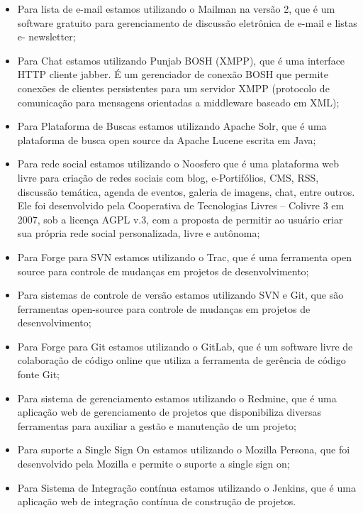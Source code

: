 \begin{itemize}

\item Para lista de e-mail estamos utilizando o Mailman na versão 2, que é um software gratuito para gerenciamento de discussão eletrônica de e-mail e listas e- newsletter;

\item Para Chat estamos utilizando Punjab BOSH (XMPP), que é uma interface HTTP cliente jabber. É um gerenciador de conexão BOSH que permite conexões de clientes persistentes para um servidor XMPP (protocolo de comunicação para mensagens orientadas a middleware baseado em XML);

\item Para Plataforma de Buscas estamos utilizando Apache Solr, que é uma plataforma de busca open source da Apache Lucene escrita em Java;

\item Para rede social estamos utilizando o Noosfero que é uma plataforma web livre para criação de redes sociais com blog, e-Portifólios, CMS, RSS, discussão temática, agenda de eventos, galeria de imagens, chat, entre outros. Ele foi desenvolvido pela Cooperativa de Tecnologias Livres – Colivre 3 em 2007, sob a licença AGPL v.3, com a proposta de permitir ao usuário criar sua própria rede social personalizada, livre e autônoma;

\item Para Forge para SVN estamos utilizando o Trac, que é uma ferramenta open source para controle de mudanças em projetos de desenvolvimento;

\item Para sistemas de controle de versão estamos utilizando SVN e Git, que são ferramentas open-source para controle de mudanças em projetos de desenvolvimento;

\item Para Forge para Git estamos utilizando o GitLab, que é um software livre de colaboração de código online que utiliza a ferramenta de gerência de código fonte Git;

\item Para sistema de gerenciamento estamos utilizando o Redmine, que é uma aplicação web de gerenciamento de projetos que disponibiliza diversas ferramentas para auxiliar a gestão e manutenção de um projeto;

\item Para suporte a Single Sign On estamos utilizando o Mozilla Persona, que foi desenvolvido pela Mozilla e permite o suporte a single sign on;

\item Para Sistema de Integração contínua estamos utilizando o Jenkins, que é uma aplicação web de integração contínua de construção de projetos.

\end{itemize}

